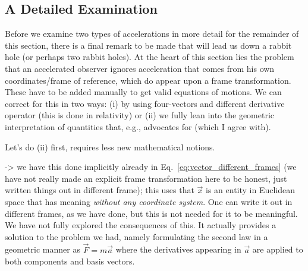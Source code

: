 \documentclass[../class_mech_main.tex]{subfiles}
\begin{document}





		\subsection{A Detailed Examination}

Before we examine two types of accelerations in more detail for the remainder of this section, there is a final remark to be made that will lead us down a rabbit hole (or perhaps two rabbit holes). At the heart of this section lies the problem that an accelerated observer ignores acceleration that comes from his own coordinates/frame of reference, which do appear upon a frame transformation. These have to be added manually to get valid equations of motions. We can correct for this in two ways: (i) by using four-vectors and different derivative operator (this is done in relativity) or (ii) we fully lean into the geometric interpretation of quantities that, e.g., \cite{Thorne_2018} advocates for (which I agree with).


Let's do (ii) first, requires less new mathematical notions. 

-> we have this done implicitly already in Eq.~\eqref{eq:vector_different_frames} (we have not really made an explicit frame transformation here to be honest, just written things out in different frame); this uses that $\vec{x}$ is an entity in Euclidean space that has meaning \emph{without any coordinate system}. One can write it out in different frames, as we have done, but this is not needed for it to be meaningful. We have not fully explored the consequences of this. It actually provides a solution to the problem we had, namely formulating the second law in a geometric manner as $\vec{F} = m \vec{a}$ where the derivatives appearing in $\vec{a}$ are applied to both components and basis vectors.
\end{document}
